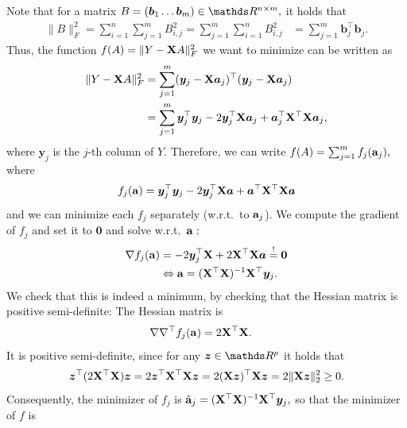 \documentclass[a4paper]{article}
\begin{document}
{\begin{enumerate}
	Note that for a matrix $B = (\bm{b}_1 \ldots \bm{b}_m) \in \R^{n\times m},$ it holds that
	\begin{align*} 
		\| B \|^2_F   
	 	=  \sum_{i=1}^n \sum_{j=1}^m B_{i,j}^2 
		=  \sum_{j=1}^m \sum_{i=1}^n B_{i,j}^2 
		&=  \sum_{j=1}^m \bm{b}_j^\top \bm{b}_j. 
	\end{align*}
	Thus, the function $f(A)=\|Y - \mathbf{X} A \|^2_F$ we want to minimize can be written as
	\begin{align*}
		\|Y - \mathbf{X} A \|^2_F 
		&= \sum_{j=1}^m (\bm{y}_j -\mathbf{X} \bm{a}_j)^\top(\bm{y}_j -\mathbf{X} \bm{a}_j) \\
		&= \sum_{j=1}^m \bm{y}_j^\top\bm{y}_j - 2 \bm{y}_j^\top \mathbf{X} \bm{a}_j + \bm{a}_j^\top \mathbf{X}^\top  \mathbf{X} \bm{a}_j,
	\end{align*}
	where $\bm{y}_j$ is the $j$-th column of $Y.$
	Therefore, we can write $f(A) = \sum_{j=1}^m f_j(\mathbf{a}_j),$ where 
	$$	f_j(\mathbf{a}) = 	\bm{y}_j^\top\bm{y}_j - 2 \bm{y}_j^\top \mathbf{X} \bm{a} + \bm{a}^\top \mathbf{X}^\top  \mathbf{X} \bm{a}	$$
	and we can minimize each $f_j$ separately (w.r.t.\ to $\mathbf{a}_j$).
	We compute the gradient of $f_j$ and set it to $\bm{0}$ and solve w.r.t.\ $\mathbf{a}:$
	\begin{align*}
		\nabla f_j(\mathbf{a}) 
		&= - 2 \bm{y}_j^\top \mathbf{X}  + 2 \mathbf{X}^\top  \mathbf{X} \bm{a} \stackrel{!}{=} \bm{0} \\
		&\Leftrightarrow \mathbf{a} = (\mathbf{X}^\top \mathbf{X})^{-1} \mathbf{X}^\top \bm{y}_j.
	\end{align*}
	We check that this is indeed a minimum, by checking that the Hessian matrix is positive semi-definite:
	The Hessian matrix is
    \begin{align*}	
        \nabla \nabla^\top f_j(\mathbf{a}) 		
        &=   2 \mathbf{X}^\top  \mathbf{X}.		
	\end{align*}
	It is positive semi-definite, since for any $\bm{z}\in \R^p$ it holds that
	\begin{align*}
		\bm{z}^\top (2 \mathbf{X}^\top  \mathbf{X}) \bm{z} 
		= 2 \bm{z}^\top  \mathbf{X}^\top  \mathbf{X}  \bm{z} 
		= 	2   (\mathbf{X}  \bm{z})^\top \mathbf{X}  \bm{z} 
		= 2 \| \mathbf{X}  \bm{z} \|_2^2 \geq 0.
	\end{align*}
	Consequently, the minimizer of $f_j$ is $\hat{\mathbf{a}}_j= (\mathbf{X}^\top \mathbf{X})^{-1} \mathbf{X}^\top \bm{y}_j,$ so that the minimizer of $f$ is 
 

\end{enumerate}}
\end{document}
